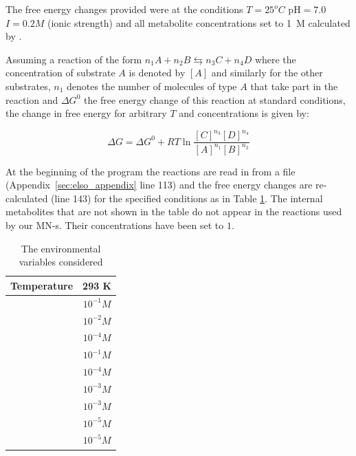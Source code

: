 \documentclass[a4paper,12pt]{article}
\begin{document}
	The free energy changes provided were at the conditions $T=25 ^o C$ pH$=7.0$ $I=0.2 M$ (ionic strength) and all metabolite concentrations set to 1~M calculated by \cite{BartekLower}. 
	
	Assuming a reaction of the form $n_1A + n_2B \leftrightarrows n_3C + n_4D$ where the concentration of substrate $A$ is denoted by $[A]$ and similarly for the other substrates, $n_1$ denotes the number of molecules of type $A$ that take part in the reaction and $\Delta G^0$ the free energy change of this reaction at standard conditions, the change in free energy for arbitrary $T$ and concentrations is given by: 
	
	\begin{equation}\label{eq:freeechange}
		\Delta G = \Delta G^0 + R T \ln \frac{[C]^{n_3}[D]^{n_4}}{[A]^{n_1}[B]^{n_2}}
	\end{equation}
	
	At the beginning of the program the reactions are read in from a file (Appendix~\ref{sec:elso_appendix} line 113) and the free energy changes are re-calculated (line 143) for the specified conditions as in Table \ref{environmentTable}. The internal metabolites that are not shown in the table do not appear in the reactions used by our MN-s. Their concentrations have been set to $1$. 
	
	\begin{table}
		\centering
	\begin{tabular}{|c|c|}
		
		\hline Temperature & 293 K \\ 
		\hline [ATP] & $10^{-1} M$ \\ 
		\hline [ADP] & $10^{-2} M$ \\ 
		\hline [AMP] & $10^{-4} M$ \\ 
		\hline [NAD$^+$] & $10^{-1} M$ \\ 
		\hline [NADH] & $10^{-4} M$ \\ 
		\hline [Pi] & $10^{-3} M$\\ 
		\hline [PPi] & $10^{-3} M$ \\ 
		\hline [CO$_2$] & $10^{-5} M$ \\ 
		\hline [NH$_3$] & $10^{-5} M$ \\ 

		\hline 
	\end{tabular} 
	\caption{The environmental variables considered}
	\label{environmentTable}
	\end{table}
\end{document}
